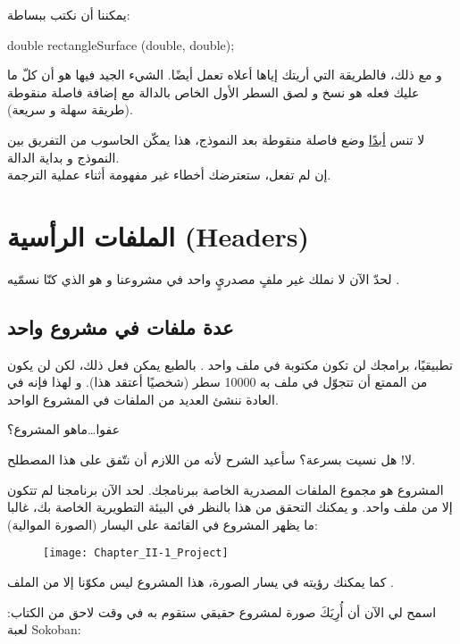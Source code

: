 يمكننا أن نكتب ببساطة:

\begin{Csource}
double rectangleSurface (double, double);
\end{Csource}

و مع ذلك، فالطريقة التي أريتك إياها أعلاه تعمل أيضًا. الشيء الجيد فيها هو أن كلّ ما عليك فعله هو نسخ و لصق السطر الأول الخاص بالدالة مع إضافة فاصلة منقوطة (طريقة سهلة و سريعة).

\begin{critical}
  لا تنس
\underline{أبدًا}
وضع فاصلة منقوطة بعد النموذج، هذا يمكّن الحاسوب من التفريق بين النموذج و بداية الدالة.\\
إن لم تفعل، ستعترضك أخطاء غير مفهومة أثناء عملية الترجمة.
\end{critical}

\section{الملفات الرأسية (\textenglish{Headers})}

لحدّ الآن لا نملك غير ملفٍ مصدريٍ واحد في مشروعنا و هو الذي كنّا نسمّيه
.

\subsection{عدة ملفات في مشروع واحد}

تطبيقيًا، برامجك لن تكون مكتوبة في ملف واحد
.
بالطبع يمكن فعل ذلك، لكن لن يكون من الممتع أن تتجوّل في ملف به 10000 سطر (شخصيًا أعتقد هذا). و لهذا فإنه في العادة ننشئ العديد من الملفات في المشروع الواحد.
\begin{question}
  عفوا\dots ماهو المشروع؟
\end{question}
لا! هل نسيت بسرعة؟ سأعيد الشرح لأنه من اللازم أن نتّفق على هذا المصطلح.

المشروع هو مجموع الملفات المصدرية الخاصة ببرنامجك. لحد الآن برنامجنا لم تتكون إلا من ملف واحد. و يمكنك التحقق من هذا بالنظر في البيئة التطويرية الخاصة بك، غالبا ما يظهر المشروع في القائمة على اليسار (الصورة الموالية):

\begin{figure}[H]
	\centering
	\texttt{[image: Chapter\_II-1\_Project]}
\end{figure}

كما يمكنك رؤيته في يسار الصورة، هذا المشروع ليس مكوّنا إلا من الملف
.

اسمح لي الآن أن أُرِيَكَ صورة لمشروع حقيقي ستقوم به في وقت لاحق من الكتاب: لعبة 
\textenglish{Sokoban}:

